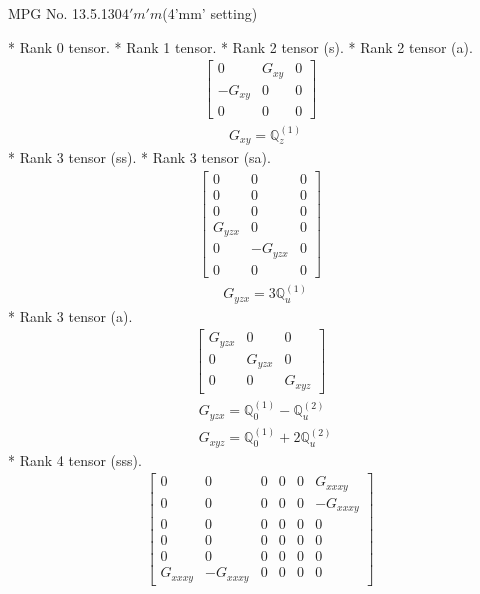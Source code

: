 \documentclass[fleqn,8pt,landscape]{jsarticle}
\begin{document}
\setcounter{MaxMatrixCols}{32}

\renewcommand{\tablename}{Table~}
\renewcommand{\figurename}{Figure~}
\begin{center}
\LARGE
MPG No. 13.5.130\quad$4'm'm$\quad(4'mm' setting)
\end{center}
* Rank 0 tensor.
* Rank 1 tensor.
* Rank 2 tensor (s).
* Rank 2 tensor (a).
\begin{align*}
\begin{bmatrix} 0 & G_{xy} & 0 \\ - G_{xy} & 0 & 0 \\ 0 & 0 & 0 \end{bmatrix}
\end{align*}
\begin{align*}
& G_{xy} = \mathbb{Q}_{z}^{(1)}
\end{align*}
* Rank 3 tensor (ss).
* Rank 3 tensor (sa).
\begin{align*}
\begin{bmatrix} 0 & 0 & 0 \\ 0 & 0 & 0 \\ 0 & 0 & 0 \\ G_{yzx} & 0 & 0 \\ 0 & - G_{yzx} & 0 \\ 0 & 0 & 0 \end{bmatrix}
\end{align*}
\begin{align*}
& G_{yzx} = 3 \mathbb{Q}_{u}^{(1)}
\end{align*}
* Rank 3 tensor (a).
\begin{align*}
\begin{bmatrix} G_{yzx} & 0 & 0 \\ 0 & G_{yzx} & 0 \\ 0 & 0 & G_{xyz} \end{bmatrix}
\end{align*}
\begin{align*}
& G_{yzx} = \mathbb{Q}_{0}^{(1)} - \mathbb{Q}_{u}^{(2)} \\
& G_{xyz} = \mathbb{Q}_{0}^{(1)} + 2 \mathbb{Q}_{u}^{(2)}
\end{align*}
* Rank 4 tensor (sss).
\begin{align*}
\begin{bmatrix} 0 & 0 & 0 & 0 & 0 & G_{xxxy} \\ 0 & 0 & 0 & 0 & 0 & - G_{xxxy} \\ 0 & 0 & 0 & 0 & 0 & 0 \\ 0 & 0 & 0 & 0 & 0 & 0 \\ 0 & 0 & 0 & 0 & 0 & 0 \\ G_{xxxy} & - G_{xxxy} & 0 & 0 & 0 & 0 \end{bmatrix}
\end{align*}
\end{document}

